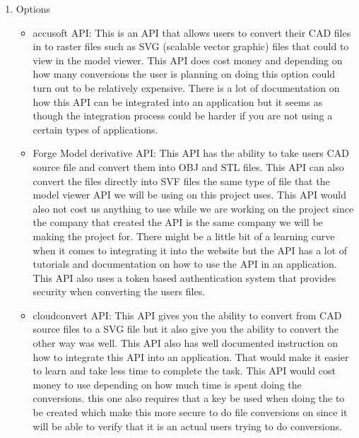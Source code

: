 \documentclass[letterpaper, 10pt, draftclsnofoot, compsoc, onecolumn]{IEEEtran}
\begin{document}
		\begin{enumerate}
			\item{Options}
				\begin{itemize}

					\item accusoft API: This is an API that allows users to convert their CAD files in to raster files such as SVG (scalable vector graphic) files that could 
						to view in the model viewer. This API does cost money and depending on how many conversions the user is planning on doing this option
						could turn out to be relatively expensive. There is a lot of documentation on how this API can be integrated into an application but it seems
						as though the integration process could be harder if you are not using a certain types of applications.

					\item  Forge Model derivative API: This API has the ability to take users CAD source file and convert them into OBJ and STL files. This API can also
						convert the files directly into SVF files the same type of file that the model viewer API we will be using on this project uses. This API would 
						also not cost us anything to use while we are working on the project since the company that created the API is the same company we will 
						be making the project for. There might be a little bit of a learning curve when it comes to integrating it into the website but the API has a 
						lot of tutorials and documentation on how to use the API in an application.  This API also uses a token based authentication system that
						provides security when converting the users files. 

					\item  cloudconvert API: This API gives you the ability to convert from CAD source files to a SVG file but it also give you the ability to convert the 
						other way was well. This API also has well documented instruction on how to integrate this API into an application. That would make it easier
						to learn and take less time to complete the task. This API would cost money to use depending on how much time is spent doing the conversions.
						this one also requires that a key be used when doing the to be created which make this more secure to do file conversions on since it will be able 
						to verify that it is an actual users trying to do conversions. 


\end{itemize}
\end{enumerate}
\end{document}
